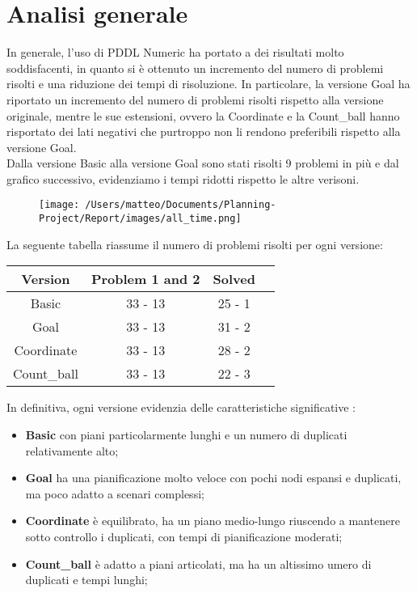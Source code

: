 \documentclass{article}
\begin{document}
\section*{Analisi generale}     
In generale, l'uso di PDDL Numeric ha portato a dei risultati molto soddisfacenti, in quanto si è ottenuto un incremento del numero di problemi risolti e una riduzione dei tempi di risoluzione.
In particolare, la versione Goal ha riportato un incremento del numero di problemi risolti rispetto alla versione originale, mentre le sue estensioni, ovvero la Coordinate e la Count\_ball hanno risportato dei 
lati negativi che purtroppo non li rendono preferibili rispetto alla versione Goal.\\
Dalla versione Basic alla versione Goal sono stati risolti 9 problemi in più e dal grafico successivo, evidenziamo i tempi ridotti rispetto le altre verisoni.
\begin{figure}[H]
    \centering
    \texttt{[image: /Users/matteo/Documents/Planning-Project/Report/images/all\_time.png]}
    \label{fig:all_versions}
\end{figure}
La seguente tabella riassume il numero di problemi risolti per ogni versione:
\begin{table}[H]
    \centering
    \begin{tabular}{|c|c|c|c|}
        \hline
        \textbf{Version} & \textbf{Problem 1 and 2} & \textbf{Solved} \\
        \hline
        Basic & 33 - 13 & 25 - 1 \\
        \hline
        Goal & 33 - 13& 31 - 2  \\
        \hline
        Coordinate & 33 - 13 & 28 - 2 \\
        \hline
        Count\_ball & 33 - 13 & 22 - 3 \\
        \hline
    \end{tabular}
\end{table}
\vspace{1cm}
In definitiva, ogni versione evidenzia delle caratteristiche significative :
\begin{itemize}
    \item \textbf{Basic} con piani particolarmente lunghi e un numero di duplicati relativamente alto;
    \item \textbf{Goal} ha una pianificazione molto veloce con pochi nodi espansi e duplicati, ma poco adatto a scenari complessi;
    \item \textbf{Coordinate} è equilibrato, ha un piano medio-lungo riuscendo a mantenere sotto controllo i duplicati, con tempi di pianificazione moderati;
    \item \textbf{Count\_ball} è adatto a piani articolati, ma ha un altissimo umero di duplicati e tempi lunghi; 
\end{itemize}
\end{document}
